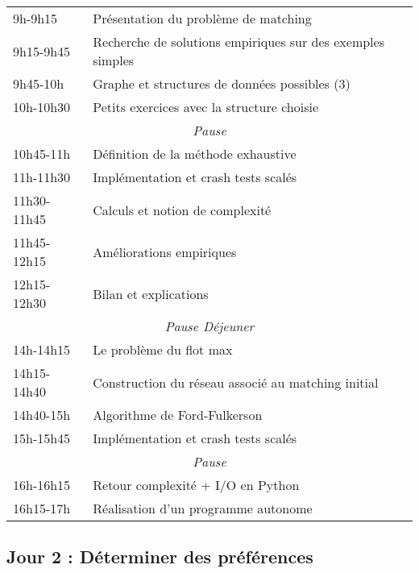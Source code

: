 \documentclass[a4paper,11pt]{article}
\newcommand{\td}{
\cellcolor{black!10}
}
\begin{document}
\begin{table}[h]

\begin{tabular}{l|l}
9h-9h15 & Présentation du problème de matching \\
9h15-9h45 &\td Recherche de solutions empiriques sur des exemples simples\\
9h45-10h & Graphe et structures de données possibles (3) \\
10h-10h30 &\td Petits exercices avec la structure choisie \\
\hline
\multicolumn{2}{c}{\textit{Pause}}\\
\hline
10h45-11h & Définition de la méthode exhaustive \\
11h-11h30 &\td Implémentation et crash tests scalés\\
11h30-11h45 & Calculs et notion de complexité \\
11h45-12h15 &\td Améliorations empiriques \\
12h15-12h30 & Bilan et explications\\
\hline
\multicolumn{2}{c}{\textit{Pause Déjeuner}}\\
\hline
14h-14h15 & Le problème du flot max \\
14h15-14h40 &\td Construction du réseau associé au matching initial\\
14h40-15h & Algorithme de Ford-Fulkerson \\
15h-15h45 &\td Implémentation et crash tests scalés \\
\hline
\multicolumn{2}{c}{\textit{Pause}}\\
\hline
16h-16h15 & Retour complexité + I/O en Python \\
16h15-17h &\td Réalisation d'un programme autonome\\
\end{tabular}
\end{table}

\subsection*{Jour 2 : Déterminer des préférences}
\end{document}
